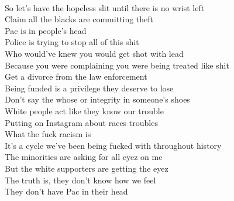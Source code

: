 \documentclass[12pt, b5paper]{article}
\begin{document}
\\So let's have the hopeless slit until there is no wrist left 
\\Claim all the blacks are committing theft 
\\Pac is in people's head 
\\Police is trying to stop all of this shit 
\\Who would've knew you would get shot with lead 
\\Because you were complaining you were being treated like shit
\\Get a divorce from the law enforcement 
\\Being funded is a privilege they deserve to lose
\\Don't say the whose or integrity in someone's shoes 
\\White people act like they know our trouble 
\\Putting on Instagram about races troubles 
\\What the fuck racism is 
\\It's a cycle we've been being fucked with throughout history
\\The minorities are asking for all eyez on me 
\\But the white supporters are getting the eyez 
\\The truth is, they don't know how we feel 
\\They don't have Pac in their head 


\newpage
\end{document}
